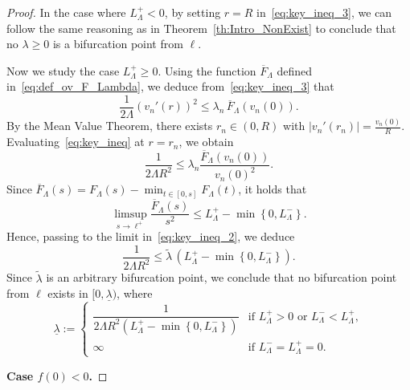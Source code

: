 \documentclass[10pt,twoside,english,reqno,a4paper]{amsart}
\theoremstyle{plain}
\theoremstyle{plain}
\theoremstyle{definition}
\theoremstyle{remark}
\numberwithin{equation}{section}
\newcommand{\oF}{\overline{F}}
\newcommand{\oLL}{L^+_\Lambda}
\newcommand{\uLL}{L^-_\Lambda}
\begin{document}
\begin{proof}
In the case where $\oLL<0$, by setting $r=R$ in~\eqref{eq:key_ineq_3}, we can follow the same reasoning as in Theorem~\ref{th:Intro_NonExist} to conclude that no $\lambda\geq 0$ is a bifurcation point from $\ell$.

Now we study the case $\oLL\geq 0$. Using the function $\oF_\Lambda$ defined in~\eqref{eq:def_ov_F_Lambda}, we deduce from~\eqref{eq:key_ineq_3} that
\begin{equation}\label{eq:key_ineq}
\frac{1}{2\Lambda}(v_n'(r))^2 \leq \lambda_n\, \overline{F}_\Lambda(v_n(0)).
\end{equation}
By the Mean Value Theorem, there exists $r_n \in (0,R)$ with $|v_n'(r_n)| = \frac{v_n(0)}{R}$. Evaluating~\eqref{eq:key_ineq} at $r = r_n$, we obtain
\begin{equation}\label{eq:key_ineq_2}
\frac{1}{2\Lambda R^2} \leq \lambda_n \frac{\overline{F}_\Lambda(v_n(0))}{v_n(0)^2}.
\end{equation}
Since $\overline{F}_\Lambda(s) = F_\Lambda(s) - \min_{t\in[0,s]} F_\Lambda(t)$, it holds that
\[
\limsup_{s\to \ell^+} \frac{\overline{F}_\Lambda(s)}{s^2} \leq \oLL - \min \left\{0,\uLL \right\}.
\]
Hence, passing to the limit in~\eqref{eq:key_ineq_2}, we deduce
\[
\frac{1}{2\Lambda R^2} \leq \tilde\lambda\, \left(\oLL - \min\left\{0,\uLL\right\} \right).
\]
Since $\tilde\lambda$ is an arbitrary bifurcation point, we conclude that no bifurcation point from $\ell$ exists in $[0,\underline\lambda)$, where
\[
\underline{\lambda} := \begin{cases}
\dfrac{1}{2\Lambda R^2 \left(\oLL - \min\left\{0,\uLL\right\} \right)} & \text{if } \oLL > 0 \text{ or } \uLL < \oLL,  \\[3mm]
\infty & \text{if } \uLL = \oLL = 0.
\end{cases}
\]

\textbf{Case $f(0)<0$.}


\end{proof}
\end{document}
